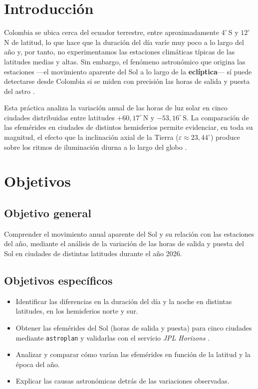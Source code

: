 \section{Introducción}

Colombia se ubica cerca del ecuador terrestre, entre aproximadamente $4^\circ$\,S y
$12^\circ$\,N de latitud, lo que hace que la duración del día varíe muy poco a lo largo
del año y, por tanto, no experimentamos las estaciones climáticas típicas de las
latitudes medias y altas.
Sin embargo, el fenómeno astronómico que origina las estaciones —el movimiento aparente
del Sol a lo largo de la \textbf{eclíptica}— sí puede detectarse desde Colombia si se
miden con precisión las horas de salida y puesta del astro \citep{CarrollOstlie2017}.

Esta práctica analiza la variación anual de las horas de luz solar en cinco ciudades
distribuidas entre latitudes $+60{,}17^\circ$\,N y $-53{,}16^\circ$\,S.
La comparación de las efemérides en ciudades de distintos hemisferios permite evidenciar,
en toda su magnitud, el efecto que la inclinación axial de la Tierra
($\varepsilon \approx 23{,}44^\circ$) produce sobre los ritmos de iluminación diurna a
lo largo del globo \citep{Meeus1998}.

\section{Objetivos}

\subsection{Objetivo general}

Comprender el movimiento anual aparente del Sol y su relación con las estaciones del
año, mediante el análisis de la variación de las horas de salida y puesta del Sol en
ciudades de distintas latitudes durante el año 2026.

\subsection{Objetivos específicos}

\begin{itemize}
  \item Identificar las diferencias en la duración del día y la noche en distintas
        latitudes, en los hemisferios norte y sur.
  \item Obtener las efemérides del Sol (horas de salida y puesta) para cinco ciudades
        mediante \texttt{astroplan} \citep{Morris2018} y validarlas con el servicio
        \textit{JPL Horizons} \citep{Giorgini1996}.
  \item Analizar y comparar cómo varían las efemérides en función de la latitud y la
        época del año.
  \item Explicar las causas astronómicas detrás de las variaciones observadas.
\end{itemize}

